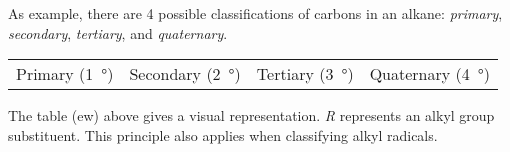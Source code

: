 		As example, there are 4 possible classifications of carbons in an alkane: \textit{primary}, \textit{secondary}, \textit{tertiary},
		and \textit{quaternary}.

		\begin{center}\begin{table}[ht]\renewcommand{\arraystretch}{1.4}
		\begin{tabu} to \textwidth {| X[c,m] | X[c,m] | X[c,m] | X[c,m] |}

			\hline
			\vspace{2mm}					\vspace{2mm}	&
			\vspace{2mm}				\vspace{2mm}	&
			\vspace{2mm}			\vspace{2mm}	&
			\vspace{2mm}		\vspace{2mm}	\\

			\hline
			Primary (\SI{1}{\degree})		&
			Secondary (\SI{2}{\degree})		&
			Tertiary (\SI{3}{\degree})		&
			Quaternary (\SI{4}{\degree})	\\
			\hline

		\end{tabu}
		\end{table}\end{center}\vspace{-10mm}

		The table (ew) above gives a visual representation. \textit{R} represents an alkyl group substituent. This principle
		also applies when classifying alkyl radicals.

















